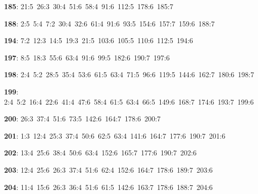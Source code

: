 \noindent \textbf{185}: 21:5\allowbreak\ 26:3\allowbreak\ 30:4\allowbreak\ 51:6\allowbreak\ 58:4\allowbreak\ 91:6\allowbreak\ 112:5\allowbreak\ 178:6\allowbreak\ 185:7\par
\noindent \textbf{188}: 2:5\allowbreak\ 5:4\allowbreak\ 7:2\allowbreak\ 30:4\allowbreak\ 32:6\allowbreak\ 61:4\allowbreak\ 91:6\allowbreak\ 93:5\allowbreak\ 154:6\allowbreak\ 157:7\allowbreak\ 159:6\allowbreak\ 188:7\par
\noindent \textbf{194}: 7:2\allowbreak\ 12:3\allowbreak\ 14:5\allowbreak\ 19:3\allowbreak\ 21:5\allowbreak\ 103:6\allowbreak\ 105:5\allowbreak\ 110:6\allowbreak\ 112:5\allowbreak\ 194:6\par
\noindent \textbf{197}: 8:5\allowbreak\ 18:3\allowbreak\ 55:6\allowbreak\ 63:4\allowbreak\ 91:6\allowbreak\ 99:5\allowbreak\ 182:6\allowbreak\ 190:7\allowbreak\ 197:6\par
\noindent \textbf{198}: 2:4\allowbreak\ 5:2\allowbreak\ 28:5\allowbreak\ 35:4\allowbreak\ 53:6\allowbreak\ 61:5\allowbreak\ 63:4\allowbreak\ 71:5\allowbreak\ 96:6\allowbreak\ 119:5\allowbreak\ 144:6\allowbreak\ 162:7\allowbreak\ 180:6\allowbreak\ 198:7\par
\noindent \textbf{199}: 2:4\allowbreak\ 5:2\allowbreak\ 16:4\allowbreak\ 22:6\allowbreak\ 41:4\allowbreak\ 47:6\allowbreak\ 58:4\allowbreak\ 61:5\allowbreak\ 63:4\allowbreak\ 66:5\allowbreak\ 149:6\allowbreak\ 168:7\allowbreak\ 174:6\allowbreak\ 193:7\allowbreak\ 199:6\par
\noindent \textbf{200}: 26:3\allowbreak\ 37:4\allowbreak\ 51:6\allowbreak\ 73:5\allowbreak\ 142:6\allowbreak\ 164:7\allowbreak\ 178:6\allowbreak\ 200:7\par
\noindent \textbf{201}: 1:3\allowbreak\ 12:4\allowbreak\ 25:3\allowbreak\ 37:4\allowbreak\ 50:6\allowbreak\ 62:5\allowbreak\ 63:4\allowbreak\ 141:6\allowbreak\ 164:7\allowbreak\ 177:6\allowbreak\ 190:7\allowbreak\ 201:6\par
\noindent \textbf{202}: 13:4\allowbreak\ 25:6\allowbreak\ 38:4\allowbreak\ 50:6\allowbreak\ 63:4\allowbreak\ 152:6\allowbreak\ 165:7\allowbreak\ 177:6\allowbreak\ 190:7\allowbreak\ 202:6\par
\noindent \textbf{203}: 12:4\allowbreak\ 25:6\allowbreak\ 26:3\allowbreak\ 37:4\allowbreak\ 51:6\allowbreak\ 62:4\allowbreak\ 152:6\allowbreak\ 164:7\allowbreak\ 178:6\allowbreak\ 189:7\allowbreak\ 203:6\par
\noindent \textbf{204}: 11:4\allowbreak\ 15:6\allowbreak\ 26:3\allowbreak\ 36:4\allowbreak\ 51:6\allowbreak\ 61:5\allowbreak\ 142:6\allowbreak\ 163:7\allowbreak\ 178:6\allowbreak\ 188:7\allowbreak\ 204:6\par
